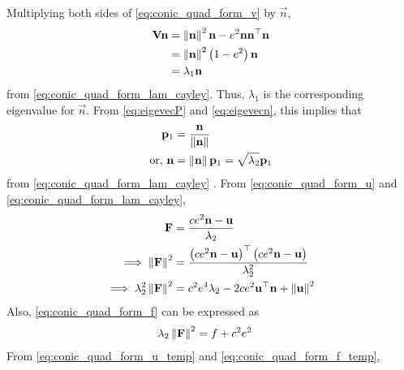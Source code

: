 Multiplying both sides of    \eqref{eq:conic_quad_form_v} by $\vec{n}$,
\begin{align}
\mathbf{V} \mathbf{n}&=\left\lVert\mathbf{n}\right\rVert^2\mathbf{n}-e^2\mathbf{n}\mathbf{n}^{\top}\mathbf{n} 
\\
&=\left\lVert\mathbf{n}\right\rVert^2\left(1-e^2\right)\mathbf{n} 
 \\
  &=\lambda_1 \mathbf{n} 
	\\
  \label{eq:eigevecn}
\end{align}  
from \eqref{eq:conic_quad_form_lam_cayley}.
Thus,  $\lambda_1$ is the corresponding eigenvalue for $\vec{n}$.  From       \eqref{eq:eigevecP} and \eqref{eq:eigevecn}, this implies that 
\begin{align}  
	\mathbf{p}_1 &= \frac{\mathbf{n}}{\left\lVert\mathbf{n}\right\rVert} 
	\\
	\text{or, }
   \mathbf{n}&= \left\lVert\mathbf{n}\right\rVert\mathbf{p}_1  = \sqrt{\lambda_2}\mathbf{p}_1 
\end{align}  
from   \eqref{eq:conic_quad_form_lam_cayley} .
From \eqref{eq:conic_quad_form_u} and \eqref{eq:conic_quad_form_lam_cayley},
\begin{align}
\mathbf{F}  &= \frac{ce^2\mathbf{n}-\mathbf{u}}{\lambda_2}
 \\
 \implies \left\lVert\mathbf{F}\right\rVert^2  &= \frac{\left(ce^2\mathbf{n}-\mathbf{u}\right)^{\top}\left(ce^2\mathbf{n}-\mathbf{u}\right)}{\lambda_2^2}
 \\
 \implies \lambda_2^2\left\lVert\mathbf{F}\right\rVert^2  &= c^2e^4\lambda_2-2ce^2\mathbf{u}^{\top}\mathbf{n}+\left\lVert\mathbf{u}\right\rVert^2
 \label{eq:conic_quad_form_u_temp}
    \end{align}
    Also, \eqref{eq:conic_quad_form_f} can be expressed as
    \begin{align}
    \lambda_2\left\lVert\mathbf{F}\right\rVert^2 &= f+c^2e^2
    \label{eq:conic_quad_form_f_temp}
\end{align}
From  \eqref{eq:conic_quad_form_u_temp} and     \eqref{eq:conic_quad_form_f_temp},
